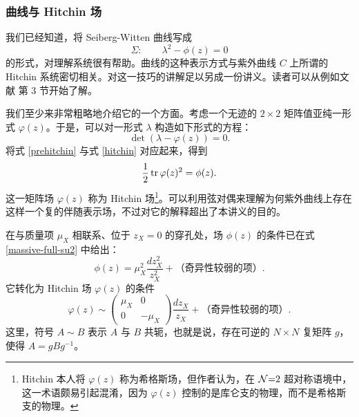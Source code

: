 \subsubsection{曲线与 Hitchin 场}\label{sec:hitchin}
我们已经知道，将 Seiberg-Witten 曲线写成
\begin{equation}
\Sigma:\qquad\lambda^2-\phi(z)=0\label{prehitchin}
\end{equation}
的形式，对理解系统很有帮助。曲线的这种表示方式与紫外曲线 $C$ 上所谓的 Hitchin 系统密切相关。对这一技巧的讲解足以另成一份讲义。读者可以从例如文献 \cite{Gaiotto:2009hg} 第 3 节开始了解。

我们至少来非常粗略地介绍它的一个方面。考虑一个无迹的 $2\times2$ 矩阵值亚纯一形式 $\varphi(z)$。于是，可以对一形式 $\lambda$ 构造如下形式的方程：
\begin{equation}
\det(\lambda-\varphi(z))=0.\label{hitchin}
\end{equation}
将式 \eqref{prehitchin} 与式 \eqref{hitchin} 对应起来，得到
\begin{equation}
\frac12\mathop{\mathrm{tr}}\nolimits\varphi(z)^2=\phi(z).\label{p-p}
\end{equation}
这一矩阵场 $\varphi(z)$ 称为 Hitchin 场\footnote{Hitchin 本人将 $\varphi(z)$ 称为希格斯场，但作者认为，在 $\mathcal{N}{=}2$ 超对称语境中，这一术语颇易引起混淆，因为 $\varphi(z)$ 控制的是库仑支的物理，而不是希格斯支的物理。}。可以利用弦对偶来理解为何紫外曲线上存在这样一个复的伴随表示场，不过对它的解释超出了本讲义的目的。

在与质量项 $\mu_X$ 相联系、位于 $z_X=0$ 的穿孔处，场 $\phi(z)$ 的条件已在式 \eqref{massive-full-su2} 中给出：
\begin{equation}
\phi(z)=\mu_X^2\frac{dz_X^2}{z_X^2}+\text{（奇异性较弱的项）}.\label{phi-full}
\end{equation}
它转化为 Hitchin 场 $\varphi(z)$ 的条件
\begin{equation}
\varphi(z)\sim\begin{pmatrix}
\mu_X&0\\
0&-\mu_X
\end{pmatrix}\frac{dz_X}{z_X}+\text{（奇异性较弱的项）}.\label{varphi-full}
\end{equation}
这里，符号 $A\sim B$ 表示 $A$ 与 $B$ 共轭，也就是说，存在可逆的 $N\times N$ 复矩阵 $g$，使得 $A=gBg^{-1}$。

